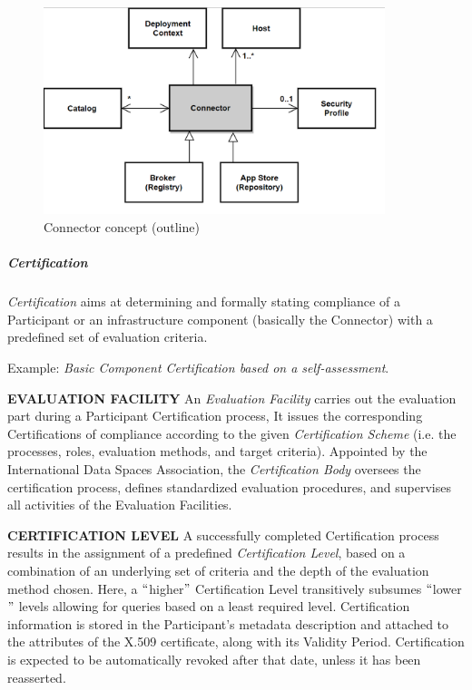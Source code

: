 \begin{figure}[H]
	\begin{Center}
		\includegraphics[width=3.92in,height=2.38in]{./media/image50.png}
		\caption{Connector concept (outline)}
		\label{fig:Connector_concept_outline}
	\end{Center}
\end{figure}




\subparagraph*{Certification}
\textit{Certification} aims at determining and formally stating compliance of a Participant or an infrastructure component (basically the Connector) with a predefined set of evaluation criteria. 

Example: \textit{Basic Component Certification based on a self-assessment}.

\textbf{EVALUATION FACILITY }An \textit{Evaluation Facility} carries out the evaluation part during a Participant Certification process, It issues the corresponding Certifications of compliance according to the given \textit{Certification Scheme} (i.e. the processes, roles, evaluation methods, and target criteria). Appointed by the International Data Spaces Association, the \textit{Certification Body }oversees the certification process, defines standardized evaluation procedures, and supervises all activities of the Evaluation Facilities. 

\textbf{CERTIFICATION LEVEL} A successfully completed Certification process results in the assignment of a predefined \textit{Certification Level}, based on a combination of an underlying set of criteria and the depth of the evaluation method chosen. Here, a $``$higher$"$  Certification Level transitively subsumes $``$lower$"$  levels allowing for queries based on a least required level. Certification information is stored in the Participant’s metadata description and attached to the attributes of the X.509 certificate, along with its Validity Period. Certification is expected to be automatically revoked after that date, unless it has been reasserted. 



